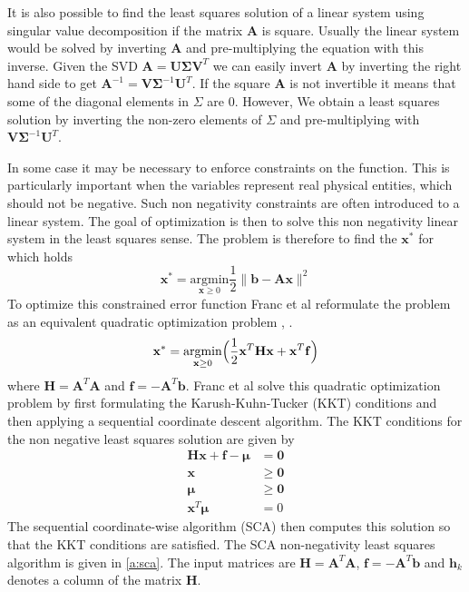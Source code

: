 \documentclass[11pt,a4paper]{report}
\begin{document}
It is also possible to find the least squares solution of a linear system using
singular value decomposition \cite{Press1992} if the matrix $\mathbf{A}$ is square. Usually the linear system would
be solved by inverting $\mathbf{A}$ and pre-multiplying the equation with this
inverse. Given the SVD $\mathbf{A} = \mathbf{U\Sigma V}^T$ we can easily invert
$\mathbf{A}$ by inverting the right hand side to get $\mathbf{A}^{-1} =
\mathbf{V\Sigma}^{-1}\mathbf{U}^T$. If the square $\mathbf{A}$ is not invertible it
means that some of the diagonal elements in $\Sigma$ are 0. However, We obtain a
least squares solution by inverting the non-zero elements of $\Sigma$ and
pre-multiplying with $\mathbf{V\Sigma}^{-1}\mathbf{U}^T$.

In some case it may be necessary to enforce constraints on the function. This is
particularly important when the variables represent real physical entities,
which should not be negative. Such non negativity constraints are often
introduced to a linear system. The goal of optimization is then to solve this
non negativity linear system in the least squares sense. The problem is
therefore to find the $\mathbf{x^*}$ for which holds
\begin{equation}\label{eq:nnls3}
\mathbf{x^*} = \underset{\mathbf{x} \ge 0}{\mathrm{argmin}} \frac{1}{2}\lVert \mathbf{b} - \mathbf{Ax} \rVert^2
\end{equation}
To optimize this constrained error function Franc et al reformulate the problem as an equivalent
quadratic optimization problem \cite{nnls}, \cite{nnls2}. 
\begin{equation}\label{eq:nnls4}
\mathbf{x^*} =  \underset{\mathbf{x} \ge 0}{\mathrm{argmin}} \Bigr( \frac{1}{2}
\mathbf{x}^T\mathbf{H}\mathbf{x} + \mathbf{x}^T\mathbf{f} \Bigl)
\end{equation}
where $\mathbf{H} = \mathbf{A}^T\mathbf{A}$ and $\mathbf{f} = -\mathbf{A}^T\mathbf{b}$.
Franc et al solve this quadratic optimization problem by first formulating the Karush-Kuhn-Tucker (KKT) conditions
and then applying a sequential coordinate descent algorithm. The KKT conditions for the non negative least squares solution are
given by
\begin{align}\label{eq:nnls5}
\mathbf{H}\mathbf{x} + \mathbf{f} - \mathbf{\mu} &= \mathbf{0}\\
\mathbf{x} &\ge \mathbf{0}\\
\mathbf{\mu} &\ge \mathbf{0}\\
\mathbf{x}^T\mathbf{\mu} &= 0
\end{align}
The sequential coordinate-wise algorithm (SCA) then computes this solution so that the
KKT conditions are satisfied. The SCA non-negativity least squares algorithm is
given in \ref{a:sca}. The input matrices are  $\mathbf{H} =
\mathbf{A}^T\mathbf{A}$, $\mathbf{f} = -\mathbf{A}^T\mathbf{b}$ and
$\mathbf{h}_k$ denotes a column of the matrix $\mathbf{H}$. 
\end{document}
